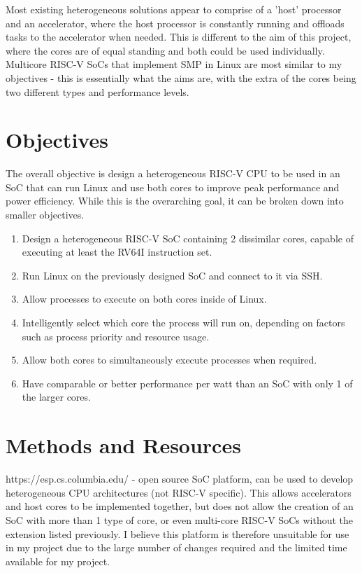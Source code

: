 \documentclass[a4paper,fleqn,11pt]{article}
\begin{document}
Most existing heterogeneous solutions appear to comprise of a 'host' processor and an accelerator, where the host processor is constantly running and offloads tasks to the accelerator when needed. This is different to the aim of this project, where the cores are of equal standing and both could be used individually. Multicore RISC-V SoCs that implement SMP in Linux are most similar to my objectives - this is essentially what the aims are, with the extra of the cores being two different types and performance levels.

\section{Objectives}
The overall objective is design a heterogeneous RISC-V CPU to be used in an SoC that can run Linux and use both cores to improve peak performance and power efficiency. While this is the overarching goal, it can be broken down into smaller objectives.
\begin{enumerate}
    \item Design a heterogeneous RISC-V SoC containing 2 dissimilar cores, capable of executing at least the RV64I instruction set.
    \item Run Linux on the previously designed SoC and connect to it via SSH.
    \item Allow processes to execute on both cores inside of Linux.
    \item Intelligently select which core the process will run on, depending on factors such as process priority and resource usage.
    \item Allow both cores to simultaneously execute processes when required.
    \item Have comparable or better performance per watt than an SoC with only 1 of the larger cores.
\end{enumerate}

\section{Methods and Resources}
https://esp.cs.columbia.edu/ - open source SoC platform, can be used to develop heterogeneous CPU architectures (not RISC-V specific). This allows accelerators and host cores to be implemented together, but does not allow the creation of an SoC with more than 1 type of core, or even multi-core RISC-V SoCs without the extension listed previously. I believe this platform is therefore unsuitable for use in my project due to the large number of changes required and the limited time available for my project.
\end{document}
